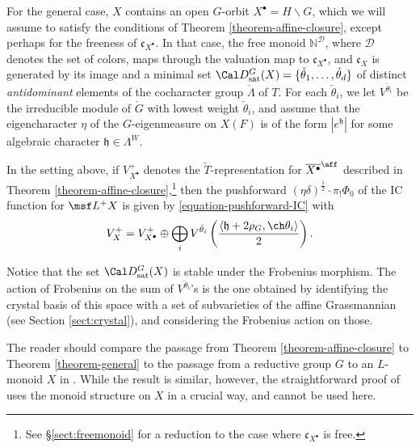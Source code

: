 For the general case, $X$ contains an open $G$-orbit $X^\bullet = H\backslash G$, which we will assume to satisfy the conditions of Theorem \ref{theorem-affine-closure}, except perhaps for the freeness of $\mathfrak c_{X^\bullet}$. In that case, the free monoid $\mathbb N^{\mathcal D}$, where $\mathcal D$ denotes the set of colors, maps through the valuation map to $\mathfrak c_{X^\bullet}$, and $\mathfrak c_X$ is generated by its image and a minimal set $\Cal D^G_{\mathrm{sat}}(X)=\{\check \theta_1, \dots,\check\theta_d\}$ of distinct \emph{antidominant} elements of the cocharacter group $\check\Lambda$ of $T$. For each $\check\theta_i$, we let $V^{\check\theta_i}$ be the irreducible module of $\check G$ with lowest weight $\check\theta_i$, and assume that the eigencharacter $\eta$ of the $G$-eigenmeasure on $X(F)$ is of the form $|e^{\mathfrak h}|$ for some algebraic character $\mathfrak h \in \Lambda^W$.

\begin{thm}
\notready
\label{theorem-general}
In the setting above, if $V_{X^\bullet}^{+}$ denotes the $\check T$-representation for $\overline{X^\bullet}^\aff$ described in Theorem \ref{theorem-affine-closure},\footnote{See \S \ref{sect:freemonoid} for a reduction to the case where $\mathfrak c_{X^\bullet}$ is free.} then the pushforward $  (\eta\delta)^\frac{1}{2}\cdot \pi_! \Phi_0 $ of the IC function for $\msf L^+X$ is given by \eqref{equation-pushforward-IC} with
\begin{equation}
 V^+_X = V_{X^\bullet}^{+} \oplus \bigoplus_i V^{\check\theta_i}\left(\frac{\left<\mathfrak h + 2\rho_G,\ch\theta_i\right>}{2}\right).
\end{equation}
\end{thm}

Notice that the set $\Cal D^G_{\mathrm{sat}}(X)$ is stable under the Frobenius morphism. The action of Frobenius on the sum of $V^{\check\theta_i}$'s is the one obtained by identifying the crystal basis of this space with a set of subvarieties of the affine Grassmannian (see Section \ref{sect:crystal}), and considering the Frobenius action on those.

The reader should compare the passage from Theorem \ref{theorem-affine-closure} to Theorem \ref{theorem-general} to the passage from a reductive group $G$ to an $L$-monoid $X$ in \cite[Theorem 4.1]{BNS,BNS-erratum}. While the result is similar, however, the straightforward proof of \cite{BNS} uses the monoid structure on $X$ in a crucial way, and cannot be used here.



